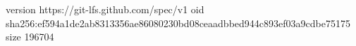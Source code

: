 version https://git-lfs.github.com/spec/v1
oid sha256:ef594a1de2ab8313356ae86080230bd08ceaadbbed944c893ef03a9cdbe75175
size 196704
